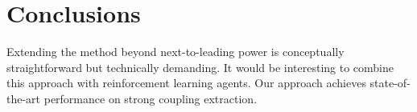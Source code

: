 \section{Conclusions}\label{sec:conclusions}

Extending the method beyond next-to-leading power is conceptually
straightforward but technically demanding. It would be interesting to
combine this approach with reinforcement learning agents. Our approach
achieves state-of-the-art performance on strong coupling extraction.

